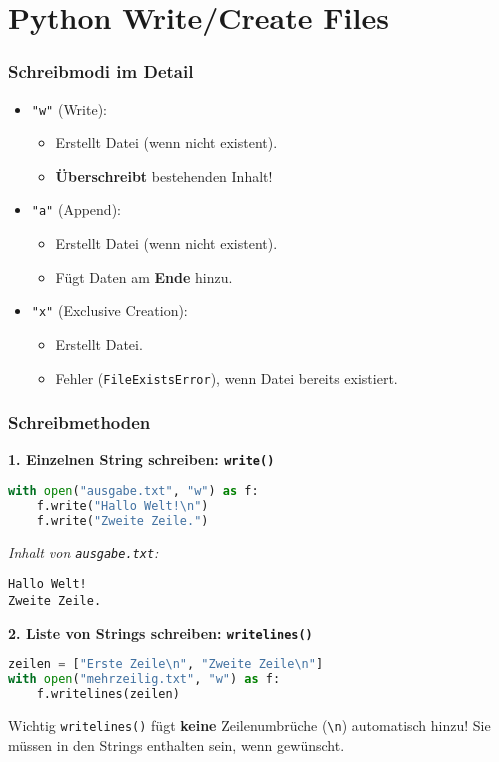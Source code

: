 \documentclass[aspectratio=169]{beamer} %
\begin{document}
\section{Python Write/Create Files}

\begin{frame}[fragile]
\frametitle{Schreibmodi im Detail}
\begin{itemize}
    \item \texttt{"w"} (Write):
    \begin{itemize}
        \item Erstellt Datei (wenn nicht existent).
        \item \textbf{Überschreibt} bestehenden Inhalt!
    \end{itemize}
    \item \texttt{"a"} (Append):
    \begin{itemize}
        \item Erstellt Datei (wenn nicht existent).
        \item Fügt Daten am \textbf{Ende} hinzu.
    \end{itemize}
    \item \texttt{"x"} (Exclusive Creation):
    \begin{itemize}
        \item Erstellt Datei.
        \item Fehler (\texttt{FileExistsError}), wenn Datei bereits existiert.
    \end{itemize}
\end{itemize}
\end{frame}

\begin{frame}[fragile]
\frametitle{Schreibmethoden}
\textbf{1. Einzelnen String schreiben: \texttt{write()}}
\begin{lstlisting}[language=Python]
with open("ausgabe.txt", "w") as f:
    f.write("Hallo Welt!\n")
    f.write("Zweite Zeile.")
\end{lstlisting}
\textit{Inhalt von \texttt{ausgabe.txt}:}
\begin{verbatim}
Hallo Welt!
Zweite Zeile.
\end{verbatim}
\vspace{1em}
\textbf{2. Liste von Strings schreiben: \texttt{writelines()}}
\begin{lstlisting}[language=Python]
zeilen = ["Erste Zeile\n", "Zweite Zeile\n"]
with open("mehrzeilig.txt", "w") as f:
    f.writelines(zeilen)
\end{lstlisting}
\begin{alertblock}{Wichtig}
\texttt{writelines()} fügt \textbf{keine} Zeilenumbrüche (\texttt{\textbackslash{}n}) automatisch hinzu! Sie müssen in den Strings enthalten sein, wenn gewünscht.
\end{alertblock}
\end{frame}
\end{document}
